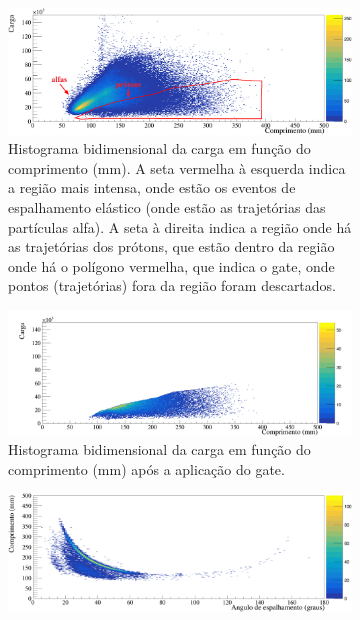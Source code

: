 \documentclass[a4paper,12pt,oneside]{book}
\begin{document}
\begin{figure}[H]
\centering
    \begin{subfigure}[b]{\textwidth}
        \centering
        \includegraphics[scale = 0.5, width=\columnwidth]{figs/carga_vs_comp_n2_2.png}
        \caption{Histograma bidimensional da carga em função do comprimento (mm). A seta vermelha à esquerda indica a região mais intensa, onde estão os eventos de espalhamento elástico (onde estão as trajetórias das partículas alfa). A seta à direita indica a região onde há as trajetórias dos prótons, que estão dentro da região onde há o polígono vermelha, que indica o gate, onde pontos (trajetórias) fora da região foram descartados.}
        \label{subfig:carga_comp_cut1}
    \end{subfigure}%
    \hfill
    \begin{subfigure}[b]{\textwidth}
        \centering
        \includegraphics[scale=0.5, width=\columnwidth]{figs/carga_vs_comp_n2_cut1.png}
        \caption{Histograma bidimensional da carga em função do comprimento (mm) após a aplicação do gate.}
        \label{subfig:carga_comp_nocut}
    \end{subfigure}%
	\hfill
    \begin{subfigure}[b]{\textwidth}
        \centering
        \includegraphics[scale=0.5, width=\columnwidth]{figs/comp_vs_ang_n2_cut1.png}

\end{subfigure}
\end{figure}
\end{document}
